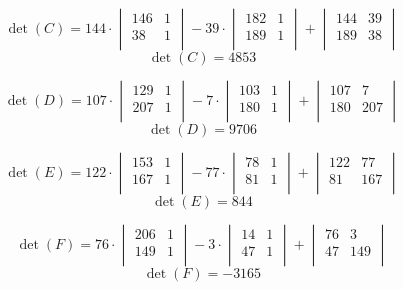 \documentclass[12pft, english]{article}
\begin{document}
\begin{multicols}{2}
  \[
    \det(C) =
    144 \cdot
    \begin{vmatrix}
      146 & 1 \\
      38 & 1 \\
    \end{vmatrix}
    -
    39 \cdot
    \begin{vmatrix}
      182 & 1 \\
      189 & 1 \\
    \end{vmatrix}
    +
    \begin{vmatrix}
      144 & 39 \\
      189 & 38 \\
    \end{vmatrix}
  \]
  \[
    \det(C) = 4853
  \]

  \[
    \det(D) =
    107 \cdot
    \begin{vmatrix}
      129 & 1 \\
      207 & 1 \\
    \end{vmatrix}
    -
    7 \cdot
    \begin{vmatrix}
      103 & 1 \\
      180 & 1 \\
    \end{vmatrix}
    +
    \begin{vmatrix}
      107 & 7 \\
      180 & 207 \\
    \end{vmatrix}
  \]
  \[
    \det(D) = 9706
  \]

  \[
    \det(E) =
    122 \cdot
    \begin{vmatrix}
      153 & 1 \\
      167 & 1 \\
    \end{vmatrix}
    -
    77 \cdot
    \begin{vmatrix}
      78 & 1 \\
      81 & 1 \\
    \end{vmatrix}
    +
    \begin{vmatrix}
      122 & 77 \\
      81 & 167 \\
    \end{vmatrix}
  \]
  \[
    \det(E) = 844
  \]

  \[
    \det(F) =
    76 \cdot
    \begin{vmatrix}
      206 & 1 \\
      149 & 1 \\
    \end{vmatrix}
    -
    3 \cdot
    \begin{vmatrix}
      14 & 1 \\
      47 & 1 \\
    \end{vmatrix}
    +
    \begin{vmatrix}
      76 & 3 \\
      47 & 149 \\
    \end{vmatrix}
  \]
  \[
    \det(F) = -3165
  \]


\end{multicols}
\end{document}
